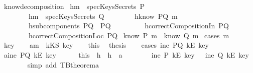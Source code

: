 \begin{isabellebody}
%
\isadelimproof
\isanewline
%
\endisadelimproof
\isanewline
{}\isamarkupfalse%
\ know{\isacharunderscore}decomposition{\isacharcolon}\isanewline
{}\ h{}{\isacharcolon}{\isachardoublequoteopen}m\ {\isasymnotin}\ specKeysSecrets\ P{\isachardoublequoteclose}\ \isanewline
\ \ \ \ \ \ \ \ h{}{\isacharcolon}{\isachardoublequoteopen}m\ {\isasymnotin}\ specKeysSecrets\ Q{\isachardoublequoteclose}\isanewline
\ \ \ \ \ \ \ \ h{}{\isacharcolon}{\isachardoublequoteopen}know\ PQ\ m{\isachardoublequoteclose}\isanewline
\ \ \ \ \ \ \ \ h{}{\isacharcolon}{\isachardoublequoteopen}subcomponents\ PQ\ {\isacharequal}\ {\isacharbraceleft}P{\isacharcomma}Q{\isacharbraceright}{\isachardoublequoteclose}\ \isanewline
\ \ \ \ \ \ \ \ h{}{\isacharcolon}{\isachardoublequoteopen}correctCompositionIn\ PQ{\isachardoublequoteclose}\isanewline
\ \ \ \ \ \ \ \ h{}{\isacharcolon}{\isachardoublequoteopen}correctCompositionLoc\ PQ{\isachardoublequoteclose}\isanewline
{}\ {\isachardoublequoteopen}know\ P\ m\ {\isasymor}\ know\ Q\ m{\isachardoublequoteclose}\isanewline
%
\isadelimproof
%
\endisadelimproof
%
\isatagproof
{}\isamarkupfalse%
\ {\isacharparenleft}cases\ m{\isacharparenright}\isanewline
\ \ \isamarkupfalse%
\ key\isanewline
\ \ \isamarkupfalse%
\ a{}{\isacharcolon}{\isachardoublequoteopen}m\ {\isacharequal}\ kKS\ key{\isachardoublequoteclose}\isanewline
\ \ \isamarkupfalse%
\ this\ \isamarkupfalse%
\ {\isacharquery}thesis\isanewline
\ \ \isamarkupfalse%
\ {\isacharparenleft}cases\ {\isachardoublequoteopen}ine\ PQ\ {\isacharparenleft}kE\ key{\isacharparenright}{\isachardoublequoteclose}{\isacharparenright}\isanewline
\ \ \ \ \isamarkupfalse%
\ a{}{}{\isacharcolon}{\isachardoublequoteopen}ine\ PQ\ {\isacharparenleft}kE\ key{\isacharparenright}{\isachardoublequoteclose}\isanewline
\ \ \ \ \isamarkupfalse%
\ this\ \ h{}\ \ h{}\ \ a{}\ \isamarkupfalse%
\ \isanewline
\ \ \ \ \ {\isachardoublequoteopen}ine\ P\ {\isacharparenleft}kE\ key{\isacharparenright}\ \ {\isasymor}\ ine\ Q\ {\isacharparenleft}kE\ key{\isacharparenright}{\isachardoublequoteclose}\isanewline
\ \ \ \ \ \ \isamarkupfalse%
\ {\isacharparenleft}simp\ add{\isacharcolon}\ TBtheorem{}a{\isacharparenright}\isanewline

\end{isabellebody}
